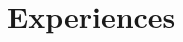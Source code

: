 \documentclass[a4paper,10pt]{article} %
\begin{document}
    

\section{Experiences}
\end{document}
